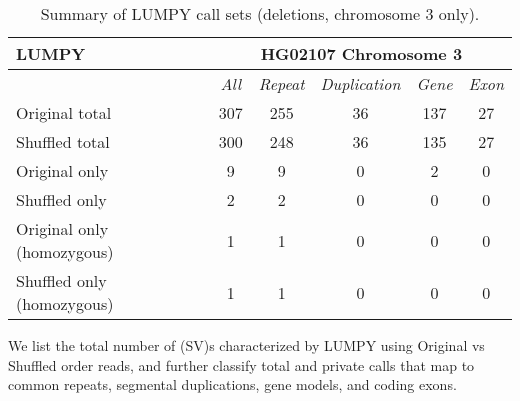 \begin{table}[htb]
\caption{ Summary of LUMPY call sets (deletions, chromosome 3 only). }
\begin{center}
\begin{tabular}{|l|c||c|c|c|c|}
\hline
{\bf LUMPY} & \multicolumn{5}{|c|}{\bf HG02107 Chromosome 3} \\
\hline
\cline{2-6}
{\bf} & {\it All} & {\it Repeat} & {\it Duplication} & {\it Gene} & {\it Exon} \\
\hline
Original total & 307 & 255 & 36 & 137 & 27 \\
\hline
Shuffled total & 300 & 248 & 36 & 135 & 27 \\
\hline
Original only & 9 & 9 & 0 & 2 & 0\\ 
\hline
Shuffled only & 2 & 2 & 0 & 0 & 0 \\
\hline
Original only (homozygous) & 1 & 1 & 0 & 0 & 0\\ 
\hline
Shuffled only (homozygous) & 1 & 1 & 0 & 0 & 0\\  
\hline
\end{tabular}
\end{center}
{\footnotesize We list the total number of (SV)s characterized by LUMPY using Original vs Shuffled order reads, 
and further classify total and private calls that map to common repeats, segmental duplications, gene models, and coding exons.}
\label{supptab:orig-vs-shuf-lumpy}
\end{table}

